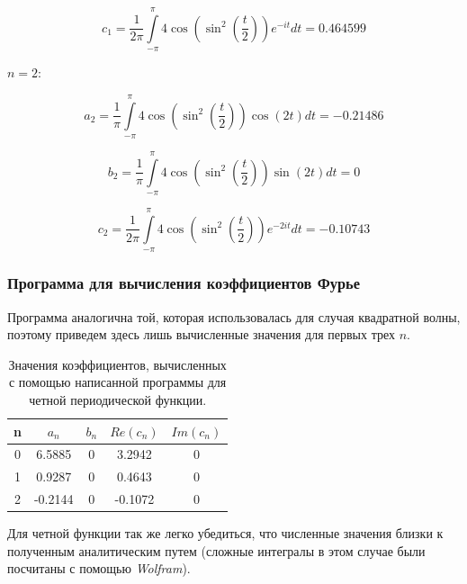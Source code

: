 \documentclass[a5paper, 10pt]{article}
\theoremstyle{definition}
\theoremstyle{plain}
\theoremstyle{remark}
\begin{document}
\begin{equation}
c_1 = \frac{1}{2 \pi} \int \limits_{-\pi}^{\pi} 4 \cos \left( \sin^2 \left( \frac{t}{2}\right) \right) e^{-i t} dt = 0.464599
\end{equation}

$n = 2:$

\begin{equation}
a_2 =  \frac{1}{\pi}\int \limits_{-\pi}^{\pi} 4 \cos \left( \sin^2 \left( \frac{t}{2}\right) \right) \cos (2t) dt = -0.21486
\end{equation}

\begin{equation}
b_2 =  \frac{1}{\pi}\int \limits_{-\pi}^{\pi} 4 \cos \left( \sin^2 \left( \frac{t}{2}\right) \right) \sin (2t) dt = 0
\end{equation}

\begin{equation}
c_2 = \frac{1}{2 \pi} \int \limits_{-\pi}^{\pi} 4 \cos \left( \sin^2 \left( \frac{t}{2}\right) \right) e^{-2i t} dt = -0.10743
\end{equation}


\subsubsection{Программа для вычисления коэффициентов Фурье}
Программа аналогична той, которая использовалась для случая квадратной волны, поэтому приведем здесь лишь вычисленные значения для первых трех $n$.

\begin{table}[h]
\caption{Значения коэффициентов, вычисленных с помощью написанной программы для четной периодической функции.}
\label{tabular:timesandtenses}
\begin{center}
\begin{tabular}{|c|c|c|c|c|}
\hline
n & $a_n$ & $b_n$ & $Re(c_n)$ & $Im(c_n)$ \\
\hline
0 & 6.5885 & 0 & 3.2942 & 0\\
\hline
1 & 0.9287 & 0 & 0.4643 & 0\\
\hline
2 & -0.2144 & 0 & -0.1072  & 0\\
\hline
\end{tabular}
\end{center}
\end{table}

Для четной функции так же легко убедиться, что численные значения близки к полученным аналитическим путем (сложные интегралы в этом случае были посчитаны с помощью \textit{Wolfram}).
\end{document}
